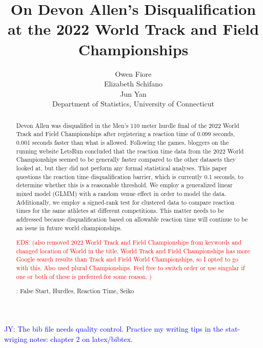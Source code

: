 \documentclass[12pt, letterpaper, titlepage]{article}
\title{On Devon Allen's Disqualification at the 2022 World Track and Field 
Championships}
\author{Owen Fiore\\
  Elizabeth Schifano\\
  Jun Yan\\[1ex]
  Department of Statistics, University of Connecticut\\
}
\date{}
\newcommand{\jy}[1]{\textcolor{blue}{JY: #1}}
\newcommand{\eds}[1]{\textcolor{red}{EDS: (#1)}}
\begin{document}
\maketitle

\begin{abstract}
Devon Allen was disqualified in the Men's 110 meter hurdle final of the 2022
World Track and Field Championships after registering a reaction time of 0.099 
seconds, 0.001 seconds faster than what is allowed. Following the games, 
bloggers on the running website LetsRun %
concluded that the reaction time data from the 2022 World Championships 
seemed to be generally faster compared to the other datasets they looked at, but 
they did not perform any formal %
statistical analyses. This paper questions the reaction time 
disqualification barrier, which is currently 0.1 seconds, to determine whether 
this is a reasonable threshold. We employ a generalized linear mixed model 
(GLMM) with a random %
venue effect in order to %
model the data. Additionally, we employ a signed-rank test for clustered data to 
compare reaction times for the same athletes at different competitions. This 
matter needs to be addressed because %
disqualification based on allowable reaction time 
will continue to be an issue in future world championships.



\eds{also removed 2022 World Track and Field Championships from keywords and 
changed location of World in the title. World Track and Field Championships
has more Google search results than Track and Field World Championships, so
I opted to go with this. Also used plural Championships. Feel free to switch 
order or use singular if one or both of these is 
preferred for some reason.  }


\bigskip\noindent{}:
False Start, Hurdles, Reaction Time, Seiko 

\end{abstract}

\doublespace

\jy{The bib file needs quality control. Practice my writing tips in the
  stat-wriging notes: chapter 2 on latex/bibtex.}
\end{document}
